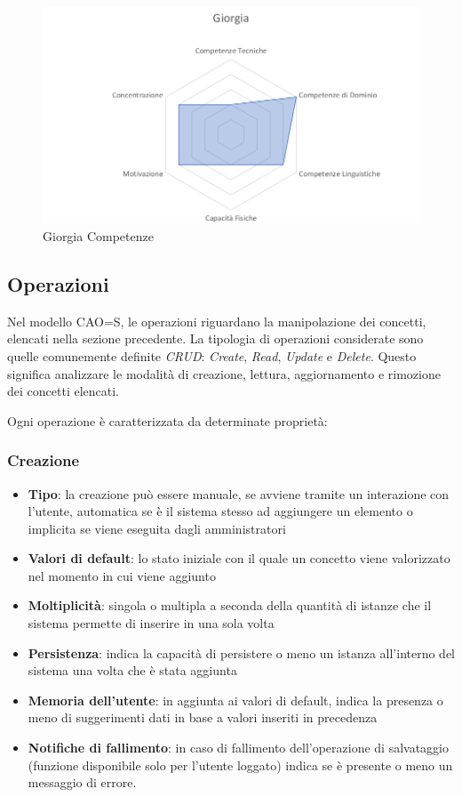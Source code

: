 \documentclass[12pt,italian,]{report}
\providecommand{\tightlist}{%
  \setlength{\itemsep}{0pt}\setlength{\parskip}{0pt}}
\begin{document}
\begin{figure}[h]
\centering
\includegraphics{img/giorgia_competenze.png}
\caption{Giorgia Competenze}
\end{figure}

\hypertarget{operazioni}{%
\subsection{Operazioni}\label{operazioni}}

Nel modello CAO=S, le operazioni riguardano la manipolazione dei concetti, elencati nella sezione precedente. La tipologia di operazioni considerate sono quelle comunemente definite \emph{CRUD}: \emph{Create}, \emph{Read}, \emph{Update} e \emph{Delete}. Questo significa analizzare le modalità di creazione, lettura, aggiornamento e rimozione dei concetti elencati.

Ogni operazione è caratterizzata da determinate proprietà:

\subsubsection{Creazione}\label{creazione}

\begin{itemize}
\tightlist
\item
  \textbf{Tipo}: la creazione può essere manuale, se avviene tramite un
  interazione con l'utente, automatica se è il sistema stesso ad
  aggiungere un elemento o implicita se viene eseguita dagli
  amministratori
\item
  \textbf{Valori di default}: lo stato iniziale con il quale un concetto
  viene valorizzato nel momento in cui viene aggiunto
\item
  \textbf{Moltiplicità}: singola o multipla a seconda della quantità di
  istanze che il sistema permette di inserire in una sola volta
\item
  \textbf{Persistenza}: indica la capacità di persistere o meno un
  istanza all'interno del sistema una volta che è stata aggiunta
\item
  \textbf{Memoria dell'utente}: in aggiunta ai valori di default, indica
  la presenza o meno di suggerimenti dati in base a valori inseriti in
  precedenza
\item
  \textbf{Notifiche di fallimento}: in caso di fallimento
  dell'operazione di salvataggio (funzione disponibile solo per l'utente loggato) indica se è presente o meno un
  messaggio di errore.
\end{itemize}
\end{document}
